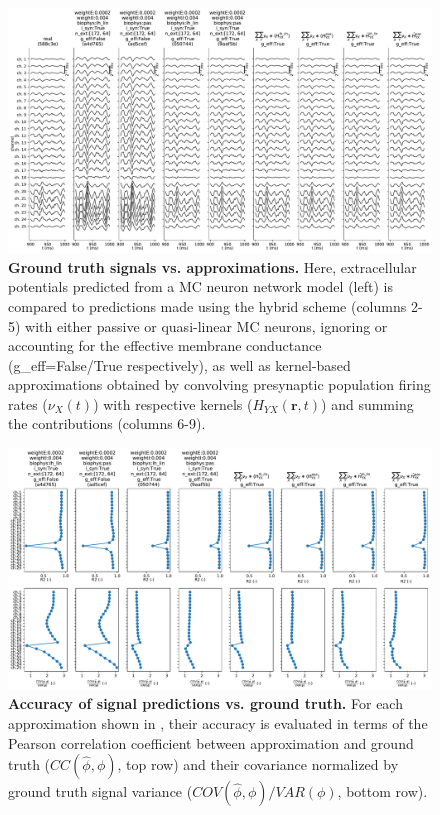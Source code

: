 \begin{figure}[!ht]
\begin{center}
\includegraphics[width=\textwidth]{Figures/Ch-LFPy/Ch-LFPy-signal_vs_predictions.pdf}
\end{center}
\caption{\textbf{Ground truth signals vs. approximations.}
Here, extracellular potentials predicted from a MC neuron network model (left) is compared to predictions made using the hybrid scheme (columns 2-5)
with either passive or quasi-linear MC neurons,
ignoring or accounting for the effective membrane conductance (g\_eff=False/True respectively),
as well as kernel-based approximations obtained by convolving presynaptic population firing rates ($\nu_X(t)$) with respective kernels ($H_{YX}(\mathbf{r}, t)$) and summing the contributions (columns 6-9).
}
\label{fig:LFPy_predictions}
\end{figure}


\begin{figure}[!ht]
\begin{center}
\includegraphics[width=\textwidth]{Figures/Ch-LFPy/Ch-LFPy-correlations.pdf}
\end{center}
\caption{\textbf{Accuracy of signal predictions vs. ground truth.}
For each approximation shown in ,
their accuracy is evaluated in terms of the Pearson correlation coefficient between approximation and ground truth ($CC(\hat{\phi}, \phi)$, top row) and
their covariance normalized by ground truth signal variance ($COV(\hat{\phi}, \phi)/VAR(\phi)$, bottom row).
}
\label{fig:LFPy_correlations}
\end{figure}


